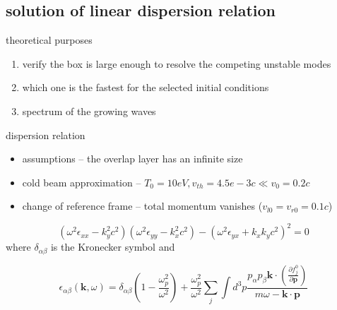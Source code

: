 \documentclass[10pt]{beamer}
\begin{document}
\subsection{solution of linear dispersion relation}

\begin{frame}{theoretical purposes}
  \begin{enumerate}
    \item verify the box is large enough to resolve the competing unstable modes
    \item which one is the fastest for the selected initial conditions
    \item spectrum of the growing waves
  \end{enumerate}
\end{frame}

\begin{frame}{dispersion relation}

  \begin{itemize}
    \item assumptions -- the overlap layer has an infinite size
    \item cold beam approximation -- $T_0 = 10eV, v_{th} = 4.5e-3c \ll v_0=0.2c$
    \item change of reference frame -- total momentum vanishes ($v_{l0} = v_{r0} = 0.1c$)
  \end{itemize}
  
  \begin{equation*}
    (\omega^2\epsilon_{xx}-k_y^2c^2)(\omega^2\epsilon_{yy}-k_x^2c^2) - (\omega^2\epsilon_{yx}+k_xk_yc^2)^2 = 0
  \end{equation*}
  where $\delta_{\alpha\beta}$ is the Kronecker symbol and 
  
  \begin{equation*}
    \epsilon_{\alpha\beta}(\bm{k},\omega) = \delta_{\alpha\beta}\left( 1-\frac{\omega_p^2}{\omega^2} \right) + \frac{\omega_p^2}{\omega^2} \sum_j \int d^3p \frac{p_{\alpha}p_{\beta}\bm{k}\cdot \left( \frac{\partial f_j^0}{\partial \bm{p}} \right)}{m\omega-\bm{k}\cdot\bm{p}}
  \end{equation*}
\end{frame}
\end{document}

